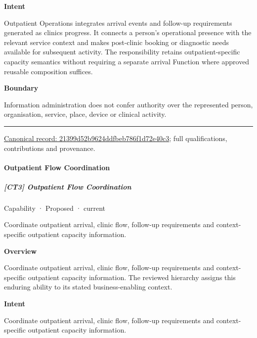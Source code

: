 \textbf{Intent}



Outpatient Operations integrates arrival events and follow-up requirements generated as clinics progress. It connects a person's operational presence with the relevant service context and makes post-clinic booking or diagnostic needs available for subsequent activity. The responsibility retains outpatient-specific capacity semantics without requiring a separate arrival Function where approved reusable composition suffices.



\textbf{Boundary}



Information administration does not confer authority over the represented person, organisation, service, place, device or clinical activity.



\medskip\hrule\medskip

{\footnotesize \href{../../../../continuum/strategy/capability/21399d52b9624ddfbeb786f1d72e40c3.md}{Canonical record: 21399d52b9624ddfbeb786f1d72e40c3}; full qualifications, contributions and provenance.}\par
\paragraph{Outpatient Flow Coordination}

\subparagraph{[CT3] Outpatient Flow Coordination}

\label{element:799ea278af014168b9b534e5fdadc6d1}
{\small Capability · Proposed · current}\par

Coordinate outpatient arrival, clinic flow, follow-up requirements and context-specific outpatient capacity information.



\textbf{Overview}



Coordinate outpatient arrival, clinic flow, follow-up requirements and context-specific outpatient capacity information. The reviewed hierarchy assigns this enduring ability to its stated business-enabling context.



\textbf{Intent}



Coordinate outpatient arrival, clinic flow, follow-up requirements and context-specific outpatient capacity information.



